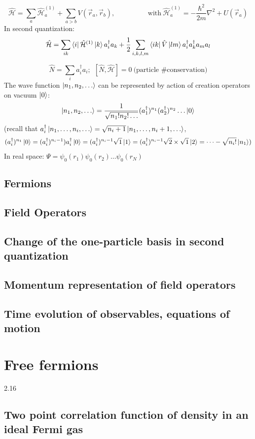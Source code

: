 \documentclass[10pt]{article}
\newcommand{\smallspace}{\hspace{2cm}}
\begin{document}
\begin{tcolorbox}[colframe = red, colback = white]
    $$
        \hat {\mathcal H} = \sum_a \hat {\mathcal H}_a^{(1)} + \sum_{a > b} V(\vec r_a, \vec r_b), \smallspace \text{with} \ \hat{\mathcal{H}}_a^{(1)} = -\frac{\hbar^2}{2m}\nabla^2 + U(\vec r_a)
    $$
    In second quantization:
    $$
    \hat{\mathcal{H}} = \sum_{ik}\bra{i}\hat{\mathcal{H}}^{(1)}\ket{k}a_i^\dagger a_k + \frac{1}{2} \sum_{i,k,l,m}\bra{ik}\hat V \ket{lm} a_i^\dagger a_k^\dagger a_m a_l
    $$
\end{tcolorbox}
$$
\hat N = \sum_i a_i^\dagger a_i; \ \ [\hat N, \hat{\mathcal{H}}] = 0 \ \text{(particle \# conservation)}
$$
The wave function $\ket{n_1, n_2,\dots}$ can be represented by action of creation operators on vacuum $\ket{0}$:
$$
\ket{n_1, n_2, \dots} = \frac{1}{\sqrt{n_1!n_2!\dots}}(a_1^\dagger)^{n_1}(a_2^\dagger)^{n_2}\dots \ket{0}
$$
(recall that $a_i^\dagger \ket{n_1, \dots , n_i,\dots} = \sqrt{n_i +1}\ket{n_1,\dots,n_i+1,\dots}$, 
$$
(a_i^\dagger)^{n_1} \ket{0} = (a_i^\dagger)^{n_i-1})a_i^\dagger \ket{0} = (a_i^\dagger)^{n_i-1}\sqrt{1}\ket{1} = (a_i^\dagger)^{n_i-1}\sqrt{2}\times \sqrt{1}\ket{2} = \dots - \sqrt{n_i!} \ket{n_1})
$$
In real space: $\Psi = \psi_0(r_1)\psi_0(r_2)\dots \psi_0(r_N)$
\subsection{Fermions}
\subsection{Field Operators}
\subsection{Change of the one-particle basis in second quantization}
\subsection{Momentum representation of field operators}
\subsection{Time evolution of observables, equations of motion}
\section{Free fermions}
2.16
\subsection{Two point correlation  function of density in an ideal Fermi gas}
\end{document}
